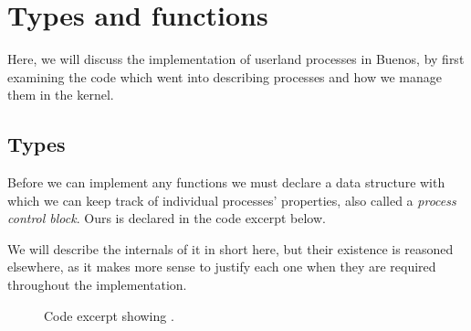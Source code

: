 %
%
%

\section{Types and functions}
Here, we will discuss the implementation of userland processes in Buenos, by
first examining the code which went into describing processes and how we
manage them in the kernel.

\subsection{Types}
Before we can implement any functions we must declare a data structure with
which we can keep track of individual processes' properties, also called a
{\it process control block}. Ours is declared in the code excerpt below.

We will describe the internals of it in short here, but their existence is
reasoned elsewhere, as it makes more sense to justify each one when they are
required throughout the implementation.

\begin{figure}[H]
    
    \label{code:process_control_block_t}
    \caption{Code excerpt showing .}
\end{figure}


